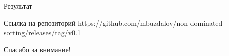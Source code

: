 \documentclass[table]{beamer}
\begin{document}
\begin{frame}{Результат}
\begin{block}{Ссылка на репозиторий}
https://github.com/mbuzdalov/non-dominated-sorting/releases/tag/v0.1
\end{block}
\end{frame}

\begin{frame}{}
\begin{center}
Спасибо за внимание!
\end{center}
\end{frame}

\appendix

%
\end{document}
